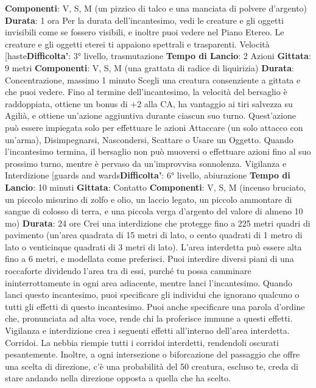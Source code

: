 \begin{multicols}{2}
\textbf{Componenti}: V, S, M (un pizzico di talco e una
manciata di polvere d’argento)
\textbf{Durata}: 1 ora
Per la durata dell’incantesimo, vedi le creature e gli
oggetti invisibili come se fossero visibili, e inoltre puoi
vedere nel Piano Etereo. Le creature e gli oggetti eterei
ti appaiono spettrali e trasparenti.
Velocità
[haste\textbf{Difficolta'}:
3° livello, trasmutazione
\textbf{Tempo di Lancio}: 2 Azioni
\textbf{Gittata}: 9 metri
\textbf{Componenti}: V, S, M (una grattata di radice di
liquirizia)
\textbf{Durata}: Concentrazione, massimo 1 minuto
Scegli una creatura consenziente a gittata e che puoi
vedere. Fino al termine dell’incantesimo, la velocità del
bersaglio è raddoppiata, ottiene un bonus di +2 alla CA,
ha vantaggio ai tiri salvezza su Agilià, e ottiene
un’azione aggiuntiva durante ciascun suo turno.
Quest’azione può essere impiegata solo per effettuare
le azioni Attaccare (un solo attacco con un’arma),
Disimpegnarsi, Nascondersi, Scattare o Usare un
Oggetto.
Quando l’incantesimo termina, il bersaglio non può
muoversi o effettuare azioni fino al suo prossimo turno,
mentre è pervaso da un’improvvisa sonnolenza.
Vigilanza e Interdizione
[guards and wards\textbf{Difficolta'}:
6° livello, abiurazione
\textbf{Tempo di Lancio}: 10 minuti
\textbf{Gittata}: Contatto
\textbf{Componenti}: V, S, M (incenso bruciato, un piccolo
misurino di zolfo e olio, un laccio legato, un piccolo
ammontare di sangue di colosso di terra, e una piccola
verga d’argento del valore di almeno 10 mo)
\textbf{Durata}: 24 ore
Crei una interdizione che protegge fino a 225 metri
quadri di pavimento (un’area quadrata di 15 metri di
lato, o cento quadrati di 1 metro di lato o venticinque
quadrati di 3 metri di lato). L’area interdetta può essere
alta fino a 6 metri, e modellata come preferisci. Puoi
interdire diversi piani di una roccaforte dividendo l’area
tra di essi, purché tu possa camminare
ininterrottamente in ogni area adiacente, mentre lanci
l’incantesimo.
Quando lanci questo incantesimo, puoi specificare gli
individui che ignorano qualcuno o tutti gli effetti di
questo incantesimo. Puoi anche specificare una parola
d’ordine che, pronunciata ad alta voce, rende chi la
proferisce immune a questi effetti.
Vigilanza e interdizione crea i seguenti effetti all’interno
dell’area interdetta.
Corridoi. La nebbia riempie tutti i corridoi interdetti,
rendendoli oscurati pesantemente. Inoltre, a ogni
intersezione o biforcazione del passaggio che offre una
scelta di direzione, c’è una probabilità del 50%
creatura, escluso te, creda di stare andando nella
direzione opposta a quella che ha scelto.

\end{multicols}

